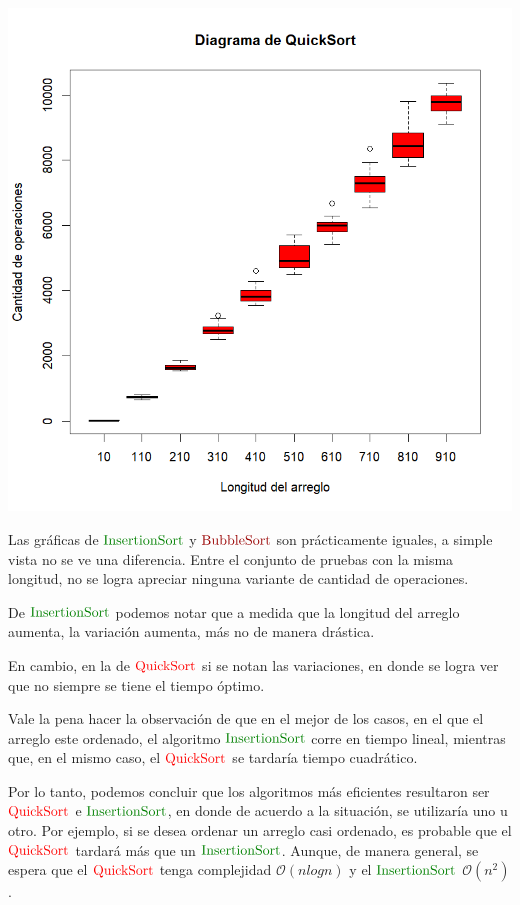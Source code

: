 \documentclass[12pt,a4paper]{article}
\begin{document}
\begin{center}
    \includegraphics[width=10 cm]{QuickBox.png} 
\end{center}

Las gr\'aficas de $\textcolor{deepgreen}{\mathrm{Insertion Sort}}$ y $\textcolor{deepred}{\mathrm{BubbleSort}}$ son pr\'acticamente iguales, a simple vista no se ve una diferencia. Entre el conjunto de pruebas con la misma longitud, no se logra apreciar ninguna variante de cantidad de operaciones.

De $\textcolor{deepgreen}{\mathrm{Insertion Sort}}$ podemos notar que a medida que la longitud del arreglo aumenta, la variaci\'on aumenta, m\'as no de manera dr\'astica.

En cambio, en la de $\textcolor{red}{\mathrm{QuickSort}}$
 si se notan las variaciones, en donde se logra ver que no siempre se tiene el tiempo \'optimo. 

Vale la pena hacer la observaci\'on de que en el mejor de los casos, en el que el arreglo este ordenado, el algoritmo $\textcolor{deepgreen}{\mathrm{Insertion Sort}}$ corre en tiempo lineal,  mientras que, en el mismo caso, el $\textcolor{red}{\mathrm{QuickSort}}$ se tardar\'ia tiempo cuadr\'atico. 

Por lo tanto, podemos concluir que los algoritmos m\'as eficientes resultaron ser $\textcolor{red}{\mathrm{QuickSort}}$
 e $\textcolor{deepgreen}{\mathrm{Insertion Sort}}$, en donde de acuerdo a la situaci\'on, se utilizar\'ia uno u otro. Por ejemplo, si se desea ordenar un arreglo casi ordenado, es probable que el  $\textcolor{red}{\mathrm{QuickSort}}$
 tardar\'a m\'as que un $\textcolor{deepgreen}{\mathrm{Insertion Sort}}$. Aunque, de manera general, se espera que el $\textcolor{red}{\mathrm{QuickSort}}$
 tenga complejidad  $\mathcal{O}(nlog{}n)$ y el $\textcolor{deepgreen}{\mathrm{Insertion Sort}}$ $\mathcal{O}(n^2)$.
\end{document}
